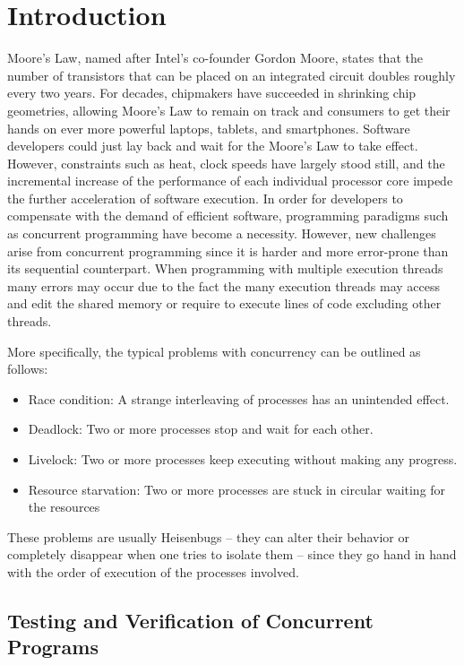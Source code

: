 \chapter{Introduction}

Moore's Law, named after Intel's co-founder Gordon Moore, states that the number of transistors that can be placed on an integrated circuit doubles
roughly every two years. For decades, chipmakers have succeeded in shrinking chip geometries, allowing Moore's Law to remain on track and consumers to 
get their hands on ever more powerful laptops, tablets, and smartphones. Software developers could just lay back and wait for the Moore's Law to take effect.
However, constraints such as heat, clock speeds have largely stood still, and the incremental increase of the performance of each individual 
processor core impede the further acceleration of software execution. In order for developers to compensate with the demand of efficient software, programming paradigms such
as concurrent programming have become a necessity. However, new challenges arise from concurrent programming since it is harder and more
error-prone than its sequential counterpart. When programming with multiple execution threads many errors may occur due to the fact the many execution threads 
may access and edit the shared memory or require to execute lines of code excluding other threads.

More specifically, the typical problems with concurrency can be outlined as follows:
\begin{itemize}
\item Race condition: A strange interleaving of processes has an unintended effect.
\item Deadlock: Two or more processes stop and wait for each other.
\item Livelock: Two or more processes keep executing without making any progress.
\item Resource starvation: Two or more processes are stuck in circular waiting for the resources
\end{itemize}

These problems are usually Heisenbugs \cite{Musu08} – they can alter their behavior or completely
disappear when one tries to isolate them – since they go hand in hand with the order of
execution of the processes involved.

\section{Testing and Verification of Concurrent Programs}

